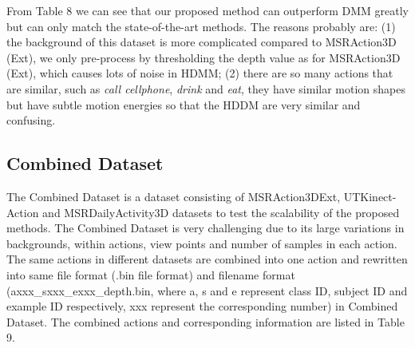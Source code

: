 \documentclass[conference]{IEEEtran}
\begin{document}
From Table 8 we can see that our proposed method can outperform DMM \cite{Yang2012a} greatly but can only match the state-of-the-art methods. The reasons probably are: (1) the background of this dataset is more complicated compared to MSRAction3D (Ext), we only pre-process by thresholding the depth value as for MSRAction3D (Ext), which causes lots of noise in HDMM; (2) there are so many actions that are similar, such as \textit{call cellphone}, \textit{drink} and \textit{eat}, they have similar motion shapes but have subtle motion energies so that the HDDM are very similar and confusing.

\subsection{Combined Dataset}
The Combined Dataset is a dataset consisting of MSRAction3DExt, UTKinect-Action and MSRDailyActivity3D datasets to test the scalability of the proposed methods. The Combined Dataset is very challenging due to its large variations in backgrounds, within actions, view points and number of samples in each action. The same actions in different datasets are combined into one action and rewritten into same file format (.bin file format) and filename format (axxx\_sxxx\_exxx\_depth.bin, where a, s and e represent class ID, subject ID and example ID respectively, xxx represent the corresponding number) in Combined Dataset. The combined actions and corresponding information are listed in Table 9.
\end{document}
